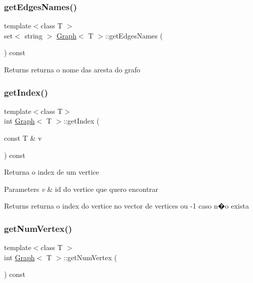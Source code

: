 \subsubsection{\texorpdfstring{get\+Edges\+Names()}{getEdgesNames()}}
{\footnotesize\ttfamily template$<$class T $>$ \\
set$<$ string $>$ \mbox{\hyperlink{class_graph}{Graph}}$<$ T $>$\+::get\+Edges\+Names (\begin{DoxyParamCaption}{ }\end{DoxyParamCaption}) const}

\begin{DoxyReturn}{Returns}
returna o nome das aresta do grafo 
\end{DoxyReturn}
\mbox{\label{class_graph_a5ab00b73eacf2bdae73d728e55144730}} 
\subsubsection{\texorpdfstring{get\+Index()}{getIndex()}}
{\footnotesize\ttfamily template$<$class T$>$ \\
int \mbox{\hyperlink{class_graph}{Graph}}$<$ T $>$\+::get\+Index (\begin{DoxyParamCaption}\item[{const T \&}]{v }\end{DoxyParamCaption}) const}

Returna o index de um vertice 
\begin{DoxyParams}{Parameters}
{\em v} & id do vertice que quero encontrar \\
\hline
\end{DoxyParams}
\begin{DoxyReturn}{Returns}
returna o index do vertice no vector de vertices ou -\/1 caso n�o exista 
\end{DoxyReturn}
\mbox{\label{class_graph_a0853eac15cdf0f06d63f4b8a7820ec71}} 
\subsubsection{\texorpdfstring{get\+Num\+Vertex()}{getNumVertex()}}
{\footnotesize\ttfamily template$<$class T $>$ \\
int \mbox{\hyperlink{class_graph}{Graph}}$<$ T $>$\+::get\+Num\+Vertex (\begin{DoxyParamCaption}{ }\end{DoxyParamCaption}) const}

